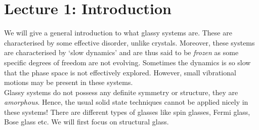 \section*{Lecture 1: Introduction}
We will give a general introduction to what glassy systems are. These are characterised by some effective disorder, unlike crystals. Moreover, these systems are characterised by `slow dynamics' and are thus said to be \textit{frozen} as some specific degrees of freedom are not evolving. Sometimes the dynamics is so slow that the phase space is not effectively explored. However, small vibrational motions may be present in these systems. \\[0.2cm]
Glassy systems do not possess any definite symmetry or structure, they are \textit{amorphous}. Hence, the usual solid state techniques cannot be applied nicely in these systems!
There are different types of glasses like spin glasses, Fermi glass, Bose glass etc. We will first focus on structural glass.
